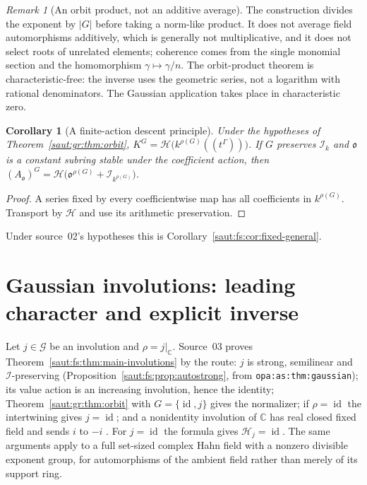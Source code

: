 \documentclass[11pt]{article}
\newtheorem{corollary}[theorem]{Corollary}
\theoremstyle{definition}
\theoremstyle{remark}
\newtheorem{remark}[theorem]{Remark}
\newcommand{\C}{\mathbb C}
\newcommand{\id}{\operatorname{id}}
\newcommand{\lbl}[1]{\nolinkurl{#1}}%
\newcommand{\Ineg}{\mathcal I}
\numberwithin{equation}{section}
\begin{document}
\begin{remark}[An orbit product, not an additive average]\label{saut:gr:rem:norm}
The construction divides the exponent by $|G|$ before taking a norm-like product. It
does not average field automorphisms additively, which is generally not
multiplicative, and it does not select roots of unrelated elements; coherence comes
from the single monomial section and the homomorphism $\gamma\mapsto\gamma/n$. The
orbit-product theorem is characteristic-free: the inverse uses the geometric series,
not a logarithm with rational denominators. The Gaussian application takes place in
characteristic zero.
\end{remark}

\begin{corollary}[A finite-action descent principle]\label{saut:gr:cor:fixed}
Under the hypotheses of Theorem~\ref{saut:gr:thm:orbit},
$K^G=\mathcal H\bigl(k^{\rho(G)}((t^\Gamma))\bigr)$. If $G$ preserves $\Ineg_k$ and
$\mathfrak o$ is a constant subring stable under the coefficient action, then
$(A_{\mathfrak o})^G=\mathcal H\bigl(\mathfrak o^{\rho(G)}+\Ineg_{k^{\rho(G)}}\bigr)$.
\end{corollary}
\begin{proof}
A series fixed by every coefficientwise map has all coefficients in $k^{\rho(G)}$.
Transport by $\mathcal H$ and use its arithmetic preservation.
\end{proof}

Under source~02's hypotheses this is Corollary~\ref{saut:fs:cor:fixed-general}.

\section{Gaussian involutions: leading character and explicit inverse}\label{saut:gr:sec:gaussian}

Let $j\in\mathcal G$ be an involution and $\rho=j|_\C$. Source~03 proves
Theorem~\ref{saut:fs:thm:main-involutions} by the route: $j$ is strong, semilinear and
$\Ineg$-preserving (Proposition~\ref{saut:fs:prop:autostrong}, from
\lbl{opa:as:thm:gaussian}); its value action is an increasing involution, hence the
identity; Theorem~\ref{saut:gr:thm:orbit} with $G=\{\id,j\}$ gives the normalizer; if
$\rho=\id$ the intertwining gives $j=\id$; and a nonidentity involution of $\C$ has
real closed fixed field and sends $i$ to $-i$ \cite[Theorem~3.1]{Conrad}. For $j=\id$
the formula gives $\mathcal H_j=\id$. The same arguments apply to a full set-sized
complex Hahn field with a nonzero divisible exponent group, for automorphisms of the
ambient field rather than merely of its support ring.
\end{document}

